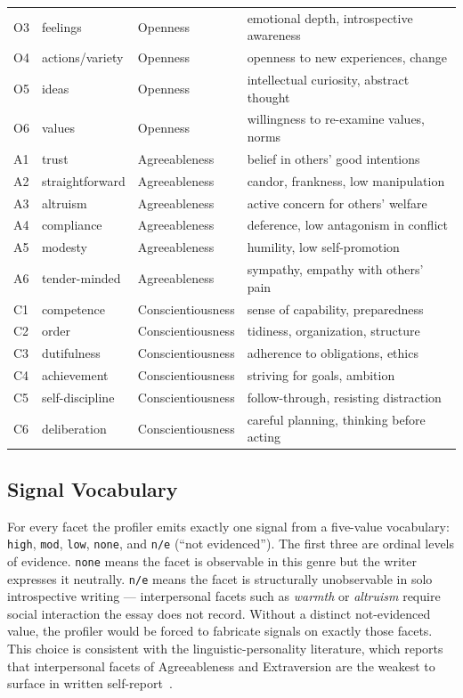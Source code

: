 \documentclass[../main.tex]{subfiles}
\begin{document}
\begin{longtable}{p{1.4cm}p{3.0cm}p{2.6cm}p{6.0cm}}
  O3 & feelings          & Openness          & emotional depth, introspective awareness \\
  O4 & actions/variety   & Openness          & openness to new experiences, change \\
  O5 & ideas             & Openness          & intellectual curiosity, abstract thought \\
  O6 & values            & Openness          & willingness to re-examine values, norms \\
  A1 & trust             & Agreeableness     & belief in others' good intentions \\
  A2 & straightforward   & Agreeableness     & candor, frankness, low manipulation \\
  A3 & altruism          & Agreeableness     & active concern for others' welfare \\
  A4 & compliance        & Agreeableness     & deference, low antagonism in conflict \\
  A5 & modesty           & Agreeableness     & humility, low self-promotion \\
  A6 & tender-minded     & Agreeableness     & sympathy, empathy with others' pain \\
  C1 & competence        & Conscientiousness & sense of capability, preparedness \\
  C2 & order             & Conscientiousness & tidiness, organization, structure \\
  C3 & dutifulness       & Conscientiousness & adherence to obligations, ethics \\
  C4 & achievement       & Conscientiousness & striving for goals, ambition \\
  C5 & self-discipline   & Conscientiousness & follow-through, resisting distraction \\
  C6 & deliberation      & Conscientiousness & careful planning, thinking before acting \\
\end{longtable}

\subsection{Signal Vocabulary}
\label{subsec:signal-vocab}

For every facet the profiler emits exactly one signal from a five-value
vocabulary: \texttt{high}, \texttt{mod}, \texttt{low}, \texttt{none}, and
\texttt{n/e} (``not evidenced''). The first three are ordinal levels of
evidence. \texttt{none} means the facet is observable in this genre but the
writer expresses it neutrally. \texttt{n/e} means the facet is structurally
unobservable in solo introspective writing --- interpersonal facets such as
\emph{warmth} or \emph{altruism} require social interaction the essay does not
record. Without a distinct not-evidenced value, the profiler would be forced to
fabricate signals on exactly those facets. This choice is consistent with
the linguistic-personality literature, which reports that interpersonal facets
of Agreeableness and Extraversion are the weakest to surface in written
self-report~\cite{pennebaker1999linguistic,mairesse2007using}.
\end{document}
